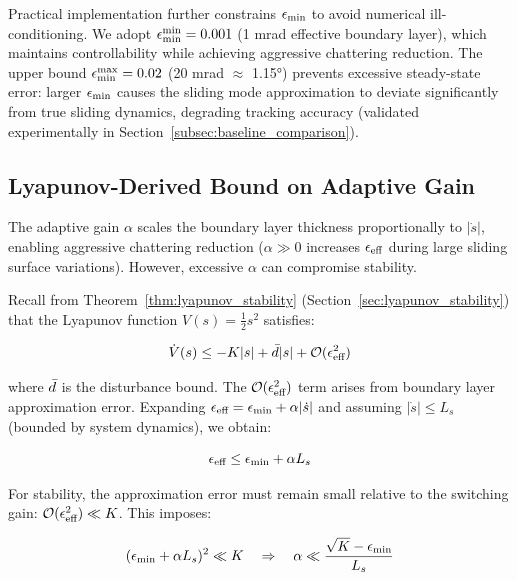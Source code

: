 Practical implementation further constrains $\epsilon_{\min}$ to avoid numerical ill-conditioning. We adopt $\epsilon_{\min}^{\min} = 0.001$ (1 mrad effective boundary layer), which maintains controllability while achieving aggressive chattering reduction. The upper bound $\epsilon_{\min}^{\max} = 0.02$ (20 mrad $\approx$ 1.15°) prevents excessive steady-state error: larger $\epsilon_{\min}$ causes the sliding mode approximation to deviate significantly from true sliding dynamics, degrading tracking accuracy (validated experimentally in Section~\ref{subsec:baseline_comparison}).

\subsection{Lyapunov-Derived Bound on Adaptive Gain}
\label{subsec:lyapunov_bound_alpha}

The adaptive gain $\alpha$ scales the boundary layer thickness proportionally to $|\dot{s}|$, enabling aggressive chattering reduction ($\alpha \gg 0$ increases $\epsilon_{\text{eff}}$ during large sliding surface variations). However, excessive $\alpha$ can compromise stability.

Recall from Theorem~\ref{thm:lyapunov_stability} (Section~\ref{sec:lyapunov_stability}) that the Lyapunov function $V(s) = \frac{1}{2} s^2$ satisfies:

\begin{equation}
\label{eq:lyapunov_derivative_bound}
\dot{V}(s) \leq -K |s| + \bar{d} |s| + \mathcal{O}(\epsilon_{\text{eff}}^2)
\end{equation}

where $\bar{d}$ is the disturbance bound. The $\mathcal{O}(\epsilon_{\text{eff}}^2)$ term arises from boundary layer approximation error. Expanding $\epsilon_{\text{eff}} = \epsilon_{\min} + \alpha |\dot{s}|$ and assuming $|\dot{s}| \leq L_s$ (bounded by system dynamics), we obtain:

\begin{equation}
\label{eq:epsilon_eff_bound}
\epsilon_{\text{eff}} \leq \epsilon_{\min} + \alpha L_s
\end{equation}

For stability, the approximation error must remain small relative to the switching gain: $\mathcal{O}(\epsilon_{\text{eff}}^2) \ll K$. This imposes:

\begin{equation}
\label{eq:alpha_lyapunov_bound}
(\epsilon_{\min} + \alpha L_s)^2 \ll K \quad \Rightarrow \quad \alpha \ll \frac{\sqrt{K} - \epsilon_{\min}}{L_s}
\end{equation}

